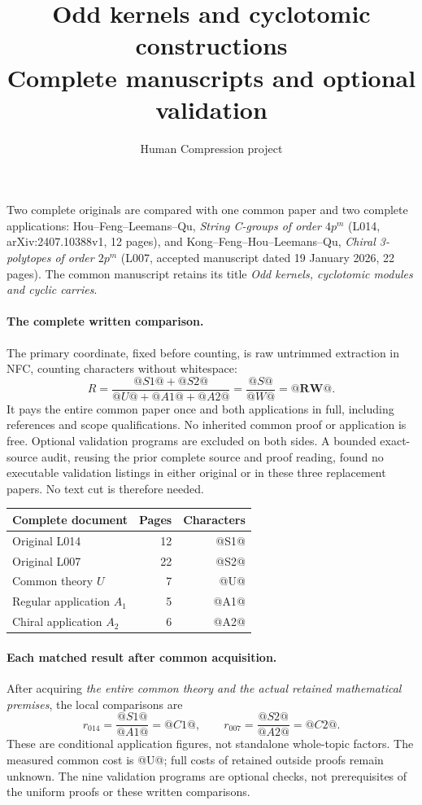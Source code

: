 \documentclass[11pt,a4paper]{article}
\title{Odd kernels and cyclotomic constructions\\Complete manuscripts and optional validation}
\author{Human Compression project}\date{}
\begin{document}
\maketitle
Two complete originals are compared with one common paper and two complete
applications: Hou--Feng--Leemans--Qu, \emph{String C-groups of order $4p^m$}
(L014, arXiv:2407.10388v1, 12 pages), and Kong--Feng--Hou--Leemans--Qu,
\emph{Chiral 3-polytopes of order $2p^m$} (L007, accepted manuscript dated
19 January 2026, 22 pages). The common manuscript retains its title
\emph{Odd kernels, cyclotomic modules and cyclic carries}.

\paragraph{The complete written comparison.}
The primary coordinate, fixed before counting, is raw untrimmed extraction
in NFC, counting characters without whitespace:
\[
 R=\frac{@S1@+@S2@}{@U@+@A1@+@A2@}
 =\frac{@S@}{@W@}=\mathbf{@RW@}.
\]
It pays the entire common paper once and both applications in full,
including references and scope qualifications. No inherited common proof or
application is free. Optional validation programs are excluded on both sides.
A bounded exact-source audit, reusing the prior complete source and proof
reading, found no executable validation listings in either original or in
these three replacement papers. No text cut is therefore needed.
\begin{center}\begin{tabular}{lrr}\toprule
Complete document&Pages&Characters\\\midrule
Original L014&12&@S1@\\
Original L007&22&@S2@\\
Common theory $U$&7&@U@\\
Regular application $A_1$&5&@A1@\\
Chiral application $A_2$&6&@A2@\\\bottomrule
\end{tabular}\end{center}
\paragraph{Each matched result after common acquisition.}
After acquiring \emph{the entire common theory and the actual retained
mathematical premises}, the local comparisons are
\[
 r_{014}=\frac{@S1@}{@A1@}=@C1@,
 \qquad r_{007}=\frac{@S2@}{@A2@}=@C2@.
\]
These are conditional application figures, not standalone whole-topic factors.
The measured common cost is @U@; full costs of retained outside proofs remain
unknown. The nine validation programs are optional checks, not prerequisites
of the uniform proofs or these written comparisons.
\end{document}
